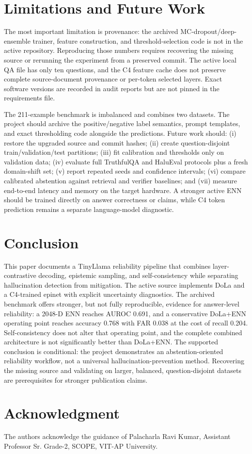 \documentclass[conference]{IEEEtran}
\begin{document}
\section{Limitations and Future Work}
The most important limitation is provenance: the archived MC-dropout/deep-ensemble trainer, feature construction, and threshold-selection code is not in the active repository. Reproducing those numbers requires recovering the missing source or rerunning the experiment from a preserved commit. The active local QA file has only ten questions, and the C4 feature cache does not preserve complete source-document provenance or per-token selected layers. Exact software versions are recorded in audit reports but are not pinned in the requirements file.

The 211-example benchmark is imbalanced and combines two datasets. The project should archive the positive/negative label semantics, prompt templates, and exact thresholding code alongside the predictions. Future work should: (i) restore the upgraded source and commit hashes; (ii) create question-disjoint train/validation/test partitions; (iii) fit calibration and thresholds only on validation data; (iv) evaluate full TruthfulQA and HaluEval protocols plus a fresh domain-shift set; (v) report repeated seeds and confidence intervals; (vi) compare calibrated abstention against retrieval and verifier baselines; and (vii) measure end-to-end latency and memory on the target hardware. A stronger active ENN should be trained directly on answer correctness or claims, while C4 token prediction remains a separate language-model diagnostic.

\section{Conclusion}
This paper documents a TinyLlama reliability pipeline that combines layer-contrastive decoding, epistemic sampling, and self-consistency while separating hallucination detection from mitigation. The active source implements DoLa and a C4-trained epinet with explicit uncertainty diagnostics. The archived benchmark offers stronger, but not fully reproducible, evidence for answer-level reliability: a 2048-D ENN reaches AUROC 0.691, and a conservative DoLa+ENN operating point reaches accuracy 0.768 with FAR 0.038 at the cost of recall 0.204. Self-consistency does not alter that operating point, and the complete combined architecture is not significantly better than DoLa+ENN. The supported conclusion is conditional: the project demonstrates an abstention-oriented reliability workflow, not a universal hallucination-prevention method. Recovering the missing source and validating on larger, balanced, question-disjoint datasets are prerequisites for stronger publication claims.

\section*{Acknowledgment}
The authors acknowledge the guidance of Palacharla Ravi Kumar, Assistant Professor Sr. Grade-2, SCOPE, VIT-AP University.



\end{document}
